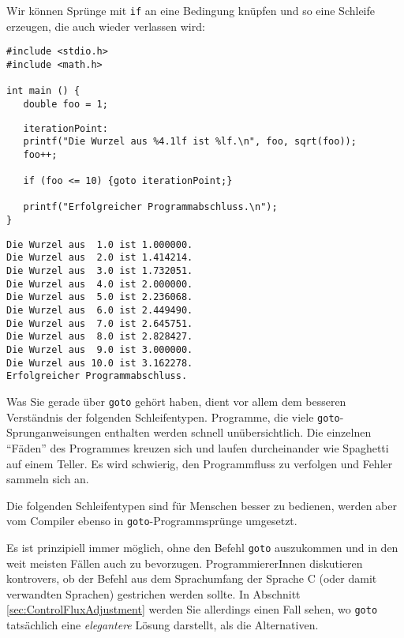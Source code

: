 Wir können Sprünge mit \texttt{if} an eine Bedingung knüpfen und so eine Schleife erzeugen, die auch wieder verlassen wird:

\begin{codebox}
\begin{verbatim}
#include <stdio.h>
#include <math.h>

int main () {
   double foo = 1;
\end{verbatim}
\end{codebox}
%
\begin{codebox}[]
\begin{verbatim}
   iterationPoint:
   printf("Die Wurzel aus %4.1lf ist %lf.\n", foo, sqrt(foo));
   foo++;

   if (foo <= 10) {goto iterationPoint;}

   printf("Erfolgreicher Programmabschluss.\n");
}
\end{verbatim}
\end{codebox}

\begin{cmdbox}
\begin{verbatim}
Die Wurzel aus  1.0 ist 1.000000.
Die Wurzel aus  2.0 ist 1.414214.
Die Wurzel aus  3.0 ist 1.732051.
Die Wurzel aus  4.0 ist 2.000000.
Die Wurzel aus  5.0 ist 2.236068.
Die Wurzel aus  6.0 ist 2.449490.
Die Wurzel aus  7.0 ist 2.645751.
Die Wurzel aus  8.0 ist 2.828427.
Die Wurzel aus  9.0 ist 3.000000.
Die Wurzel aus 10.0 ist 3.162278.
Erfolgreicher Programmabschluss.
\end{verbatim}
\end{cmdbox}

\begin{warnbox}
Was Sie gerade über \texttt{goto} gehört haben, dient vor allem dem besseren Verständnis der folgenden Schleifentypen. Programme, die viele \texttt{goto}-Sprunganweisungen enthalten werden schnell unübersichtlich. Die einzelnen \enquote{Fäden} des Programmes kreuzen sich und laufen durcheinander wie Spaghetti auf einem Teller. Es wird schwierig, den Programmfluss zu verfolgen und Fehler sammeln sich an.

Die folgenden Schleifentypen sind für Menschen besser zu bedienen, werden aber vom Compiler ebenso in \texttt{goto}-Programmsprünge umgesetzt.

Es ist prinzipiell immer möglich, ohne den Befehl \texttt{goto} auszukommen und in den weit meisten Fällen auch zu bevorzugen. ProgrammiererInnen diskutieren kontrovers, ob der Befehl aus dem Sprachumfang der Sprache C (oder damit verwandten Sprachen) gestrichen werden sollte. In Abschnitt \ref{sec:ControlFluxAdjustment} werden Sie allerdings einen Fall sehen, wo \texttt{goto} tatsächlich eine \emph{elegantere} Lösung darstellt, als die Alternativen.
\end{warnbox}

